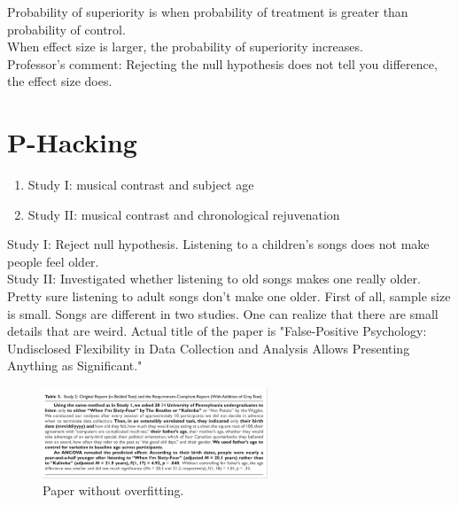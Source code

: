 Probability of superiority is when probability of treatment is greater than probability of control.\\
When effect size is larger, the probability of superiority increases.\\
Professor's comment: Rejecting the null hypothesis does not tell you difference, the effect size does.\\

\newpage
\section{P-Hacking}

\begin{enumerate}
  \item Study I: musical contrast and subject age
  \item Study II: musical contrast and chronological rejuvenation
\end{enumerate} 

Study I: Reject null hypothesis. Listening to a children's songs does not make people feel older.\\
Study II: Investigated whether listening to old songs makes one really older.\\

Pretty sure listening to adult songs don't make one older. First of all, sample size is small. Songs are different in two studies. One can realize that there are small details that are weird. Actual title of the paper is "False-Positive Psychology: Undisclosed Flexibility in Data Collection and Analysis Allows Presenting Anything as Significant."\\


\begin{figure}[ht]
  \begin{center}
    \includegraphics[width=0.6\textwidth]{figures/4.png}
    \caption{
      Paper without overfitting.}
    \label{fig:example_figure}
  \end{center}
\end{figure}


